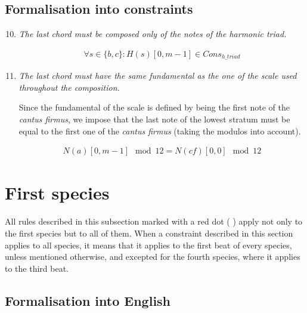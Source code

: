 \subsection{Formalisation into constraints} \label{sec:generalconstraints}
\begin{enumerate}[wide, label=\bfseries G\arabic*]
    \setcounter{enumi}{9} %
    \item \textit{The last chord must be composed only of the notes of the harmonic triad.} \label{constraint:last-chord-h-triad}
    
    \begin{equation} \begin{aligned}
    \forall s \in \{b, c\} \colon H(s)[0, m-1] \in Cons_{h\_triad}
    \end{aligned} \end{equation}

    \item \textit{The last chord must have the same fundamental as the one of the scale used throughout the composition.}\label{constraint:same-fundamental}

    Since the fundamental of the scale is defined by being the first note of the \textit{cantus firmus}, we impose that the last note of the lowest stratum must be equal to the first one of the \textit{cantus firmus} (taking the modulos into account).
    
    
    \begin{equation} \begin{aligned}
    N(a)[0, m-1] \mod 12 = N(cf)[0, 0] \mod 12
    \end{aligned} \end{equation}
\end{enumerate}

\section{First species}
All rules described in this subsection marked with a red dot ( \reddot) apply not only to the first species but to all of them. When a constraint described in this section applies to all species, it means that it applies to the first beat of every species, unless mentioned otherwise, and excepted for the fourth species, where it applies to the third beat.

\subsection{Formalisation into English}
